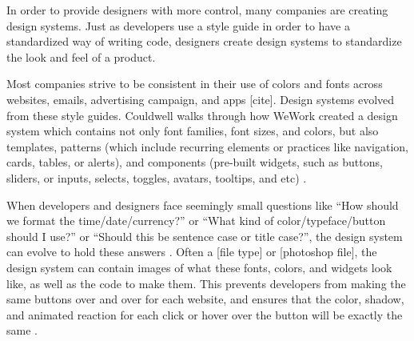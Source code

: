 \documentclass{sigchi}
\begin{document}
In order to provide designers with more control, many companies are creating design systems. Just as developers use a style guide in order to have a standardized way of writing code, designers create design systems to standardize the look and feel of a product. 

Most companies strive to be consistent in their use of colors and fonts across websites, emails, advertising campaign, and apps [cite]. Design systems evolved from these style guides. Couldwell walks through how WeWork created a design system which contains not only font families, font sizes, and colors, but also templates, patterns (which include recurring elements or practices like navigation, cards, tables, or alerts), and components (pre-built widgets, such as buttons, sliders, or inputs, selects, toggles, avatars, tooltips, and etc) \cite{design_system_at_plasma_couldwell_medium_2017}. 




When developers and designers face seemingly small questions like ``How should we format the time/date/currency?'' or ``What kind of color/typeface/button should I use?'' or ``Should this be sentence case or title case?'', the design system can evolve to hold these answers \cite{what_is_design_system_couldwell_medium_2017}. Often a [file type] or [photoshop file], the design system can contain images of what these fonts, colors, and widgets look like, as well as the code to make them. This prevents developers from making the same buttons over and over for each website, and ensures that the color, shadow, and animated reaction for each click or hover over the button will be exactly the same \cite{what_is_design_system_couldwell_medium_2017}. 
\end{document}
